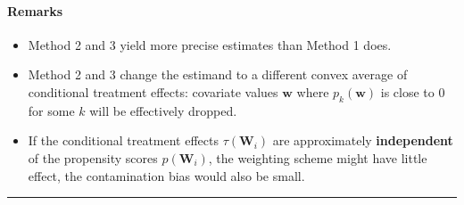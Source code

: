 \documentclass[twoside]{article}
\begin{document}
\paragraph*{Remarks}
\begin{itemize}
    \item Method 2 and 3 yield more precise estimates than Method 1 does.
    \item Method 2 and 3 change the estimand to a different convex average of conditional treatment effects: covariate values $\mathbf{w}$ where $p_k(\mathbf{w})$ is close to 0 for some $k$ will be effectively dropped.
    \item If the conditional treatment effects $\tau(\mathbf{W}_i)$ are approximately \textbf{independent} of the propensity scores $p(\mathbf{W}_i)$, the weighting scheme might have little effect, the contamination bias would also be small.
\end{itemize}

\vspace*{20pt}
\noindent\rule{0.995\textwidth}{0.5pt}
\vspace*{-10pt}


\end{document}
